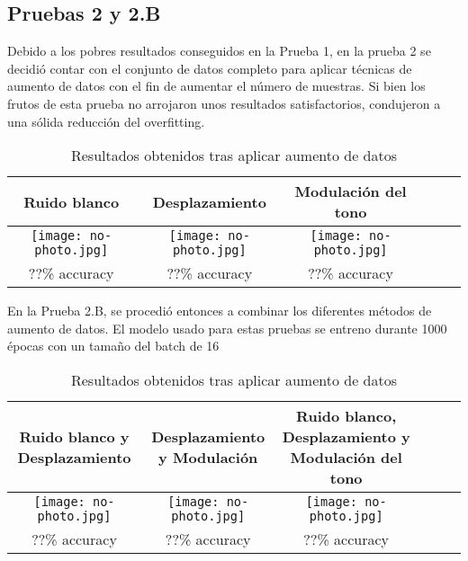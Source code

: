\documentclass[11pt,a4paper,spanish]{book}
\begin{document}
	\subsection{Pruebas 2 y 2.B} %
	Debido a los pobres resultados conseguidos en la Prueba 1, en la prueba 2 se decidió contar con el conjunto de datos completo para aplicar técnicas de aumento de datos con el fin de aumentar el número de muestras. Si bien los frutos de esta prueba no arrojaron unos resultados satisfactorios, condujeron a una sólida reducción del overfitting.
	
	\begin{table}[H]
		\centering
		\begin{center}
			\begin{tabular}{| c | c | c | c | c | c |}
				\hline
				Ruido blanco & Desplazamiento & Modulación del tono \\ 
				\hline
				\texttt{[image: no-photo.jpg]} & \texttt{[image: no-photo.jpg]} & \texttt{[image: no-photo.jpg]}\\
				\hline
				??\% accuracy  & ??\%  accuracy & ??\% accuracy \\
				\hline	
			\end{tabular}
			\caption{Resultados obtenidos tras aplicar aumento de datos}
		\end{center}
	\end{table}
	En la Prueba 2.B, se procedió entonces a combinar los diferentes métodos de aumento de datos. El modelo usado para estas pruebas se entreno durante 1000 épocas con un tamaño del batch de 16
	
	\begin{table}[H]
		\centering
		\begin{center}
			\begin{tabular}{| c | c | c | c | c | c |}
				\hline
				Ruido blanco y Desplazamiento& Desplazamiento y Modulación & Ruido blanco, Desplazamiento y Modulación del tono \\ 
				\hline
				\texttt{[image: no-photo.jpg]} & \texttt{[image: no-photo.jpg]} & \texttt{[image: no-photo.jpg]}\\
				\hline
				??\% accuracy & ??\%  accuracy & ??\% accuracy \\
				\hline	
			\end{tabular}
			\caption{Resultados obtenidos tras aplicar aumento de datos}
		\end{center}
	\end{table}
	
\end{document}
